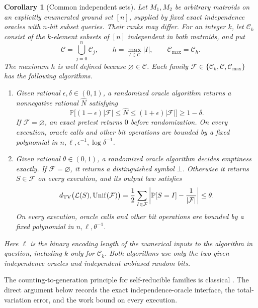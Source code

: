 \documentclass[11pt]{article}
\newtheorem{corollary}[theorem]{Corollary}
\theoremstyle{definition}
\newcommand{\Prob}{\mathbb P}
\begin{document}
\begin{corollary}[Common independent sets]\label{cor:intersection}
Let $M_1,M_2$ be arbitrary matroids on an explicitly enumerated ground
set $[n]$, supplied by fixed exact independence oracles with $n$-bit
subset queries.  Their ranks may differ.  For an integer $k$, let
$\mathcal C_k$ consist of the $k$-element subsets of $[n]$ independent
in both matroids, and put
\[
 \mathcal C=\bigcup_{j=0}^n\mathcal C_j,\qquad
 h=\max_{I\in\mathcal C}|I|,\qquad
 \mathcal C_{\max}=\mathcal C_h.
\]
The maximum $h$ is well defined because $\varnothing\in\mathcal C$.
Each family $\mathcal F\in\{\mathcal C_k,\mathcal C,\mathcal C_{\max}\}$
has the following algorithms.
\begin{enumerate}[label=(\roman*)]
\item Given rational $\epsilon,\delta\in(0,1)$, a randomized oracle
algorithm returns a nonnegative rational $\widehat N$ satisfying
\[
 \Prob\bigl[(1-\epsilon)|\mathcal F|\le\widehat N
                         \le(1+\epsilon)|\mathcal F|\bigr]\ge1-\delta.
\]
If $\mathcal F=\varnothing$, an exact pretest returns $0$ before
randomization.  On every execution, oracle calls and other bit operations
are bounded by a fixed polynomial in
$n,\ell,\epsilon^{-1},\log\delta^{-1}$.
\item Given rational $\theta\in(0,1)$, a randomized oracle algorithm
decides emptiness exactly.  If $\mathcal F=\varnothing$, it returns a
distinguished symbol $\bot$.  Otherwise it returns $S\in\mathcal F$ on
every execution, and its output law satisfies
\[
 d_{\rm TV}\bigl(\mathcal L(S),\operatorname{Unif}(\mathcal F)\bigr)
 =\frac12\sum_{I\in\mathcal F}
       \left|\Prob[S=I]-\frac1{|\mathcal F|}\right|\le\theta.
\]
On every execution, oracle calls and other bit operations are bounded by
a fixed polynomial in $n,\ell,\theta^{-1}$.
\end{enumerate}
Here $\ell$ is the binary encoding length of the numerical inputs to the
algorithm in question, including $k$ only for $\mathcal C_k$.
Both algorithms use only the two given independence oracles and
independent unbiased random bits.
\end{corollary}

The counting-to-generation principle for self-reducible families is
classical \cite[Section~6]{JVV1986}.  The direct argument below records
the exact independence-oracle interface, the total-variation error, and
the work bound on every execution.
\end{document}
